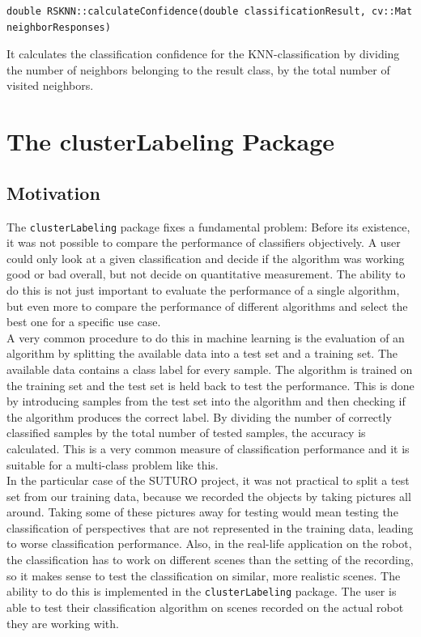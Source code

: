 \documentclass[main.tex]{subfiles}
\begin{document}
\begin{lstlisting}
double RSKNN::calculateConfidence(double classificationResult, cv::Mat neighborResponses)
\end{lstlisting}

It calculates the classification confidence for the KNN-classification by dividing the number of neighbors belonging to the result class, by the total number of visited neighbors. 

\section{The clusterLabeling Package}\label{clusterLabeling}
\subsection{Motivation}
The \texttt{clusterLabeling} package fixes a fundamental problem: Before its existence, it was not possible to compare the performance of classifiers objectively. A user could only look at a given classification and decide if the algorithm was working good or bad overall, but not decide on quantitative measurement. The ability to do this is not just important to evaluate the performance of a single algorithm, but even more to compare the performance of different algorithms and select the best one for a specific use case.\\

A very common procedure to do this in machine learning is the evaluation of an algorithm by splitting the available data into a test set and a training set. The available data contains a class label for every sample. The algorithm is trained on the training set and the test set is held back to test the performance. This is done by introducing samples from the test set into the algorithm and then checking if the algorithm produces the correct label. By dividing the number of correctly classified samples by the total number of tested samples, the accuracy is calculated. This is a very common measure of classification performance and it is suitable for a multi-class problem like this.\\

In the particular case of the SUTURO project, it was not practical to split a test set from our training data, because we recorded the objects by taking pictures all around. Taking some of these pictures away for testing would mean testing the classification of perspectives that are not represented in the training data, leading to worse classification performance. Also, in the real-life application on the robot, the classification has to work on different scenes than the setting of the recording, so it makes sense to test the classification on similar, more realistic scenes. The ability to do this is implemented in the \texttt{clusterLabeling} package. The user is able to test their classification algorithm on scenes recorded on the actual robot they are working with.  
\end{document}

